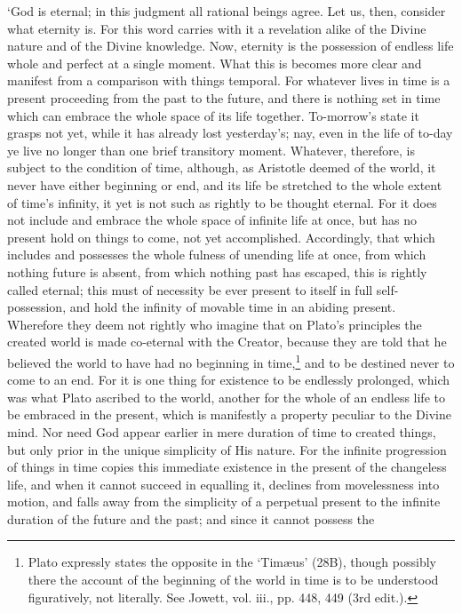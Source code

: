 \documentclass[12pt]{book}
\begin{document}
`God is eternal; in this judgment all rational beings agree. Let us,
then, consider what eternity is. For this word carries with it a
revelation alike of the Divine nature and of the Divine knowledge. Now,
eternity is the possession of endless life whole and perfect at a single
moment. What this is becomes more clear and manifest from a comparison
with things temporal. For whatever lives in time is a present proceeding
from the past to the future, and there is nothing set in time which can
embrace the whole space of its life together. To-morrow's state it
grasps not yet, while it has already lost yesterday's; nay, even in the
life of to-day ye live no longer than one brief transitory moment.
Whatever, therefore, is subject to the condition of time, although, as
Aristotle deemed of the world, it never have either beginning or end,
and its life be stretched to the whole extent of time's infinity, it yet
is not such as rightly to be thought eternal. For it does not include
and embrace the whole space of infinite life at once, but has no present
hold on things to come, not yet accomplished. Accordingly, that which
includes and possesses the whole fulness of unending life at once, from
which nothing future is absent, from which nothing past has escaped,
this is rightly called eternal; this must of necessity be ever present
to itself in full self-possession, and hold the infinity of movable time
in an abiding present. Wherefore they deem not rightly who imagine that
on Plato's principles the created world is made co-eternal with the
Creator, because they are told that he believed the world to have had
no beginning in time,\footnote{Plato expressly states the opposite in the `Timæus' (28B), though
possibly there the account of the beginning of the world in time is to
be understood figuratively, not literally. See Jowett, vol. iii., pp.
448, 449 (3rd edit.).} and to be destined never to come to an end. For
it is one thing for existence to be endlessly prolonged, which was what
Plato ascribed to the world, another for the whole of an endless life to
be embraced in the present, which is manifestly a property peculiar to
the Divine mind. Nor need God appear earlier in mere duration of time to
created things, but only prior in the unique simplicity of His nature.
For the infinite progression of things in time copies this immediate
existence in the present of the changeless life, and when it cannot
succeed in equalling it, declines from movelessness into motion, and
falls away from the simplicity of a perpetual present to the infinite
duration of the future and the past; and since it cannot possess the
\end{document}
